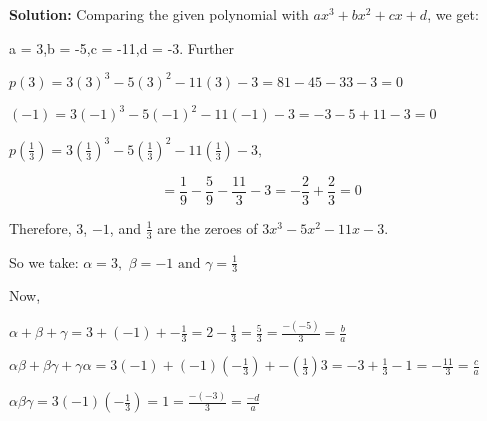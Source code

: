 \documentclass[12pt,twoside]{article}
\newcommand{\solution}{\noindent \textbf{\textcolor{customblue}{Solution:} }}
\begin{document}
\solution Comparing the given polynomial with $ax^3 + bx^2 + cx + d$, we get:

a = 3,b = -5,c = -11,d = -3. Further

\(p(3) = 3(3)^3 - 5(3)^2 - 11(3) - 3 = 81 - 45 - 33 - 3 = 0\)


\((-1) = 3(-1)^3 - 5(-1)^2 - 11(-1) - 3 = -3 - 5 + 11 - 3 = 0\)


\(p\left(\frac{1}{3}\right) = 3\left(\frac{1}{3}\right)^3 - 5\left(\frac{1}{3}\right)^2 - 11\left(\frac{1}{3}\right) - 3,\) 

\[=\frac{1}{9} - \frac{5}{9} - \frac{11}{3} - 3 = -\frac{2}{3}+\frac{2}{3}= 0\]

Therefore, $3$, $-1$, and $\frac{1}{3}$ are the zeroes of $3x^3 - 5x^2 - 11x - 3$. 

So we take: $\alpha = 3,$ $ \beta = -1 $ $\text{and}  $ $\gamma = \frac{1}{3}$

Now,


\quad \(\alpha + \beta + \gamma = 3 + (-1) + -\frac{1}{3} = 2-\frac{1}{3} = \frac{5}{3}=\frac{-(-5)}{3}=\frac{b}{a}\)


\quad \(\alpha\beta + \beta\gamma + \gamma\alpha = 3  (-1) + (-1) (-\frac{1}{3}) + -(\frac{1}{3})  3 = -3 + \frac{1}{3} - 1 = -\frac{11}{3} = \frac{c}{a} \)


\quad \(\alpha\beta\gamma = 3 (-1)  (-\frac{1}{3}) = 1  = \frac{-(-3)}{3}=\frac{-d}{a}\)
\end{document}
